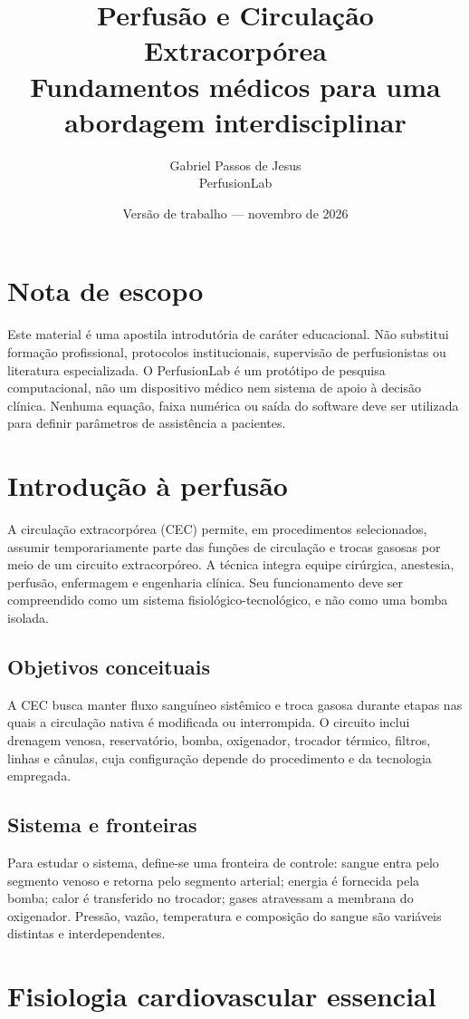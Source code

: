\documentclass[11pt,a4paper,oneside]{book}
\title{Perfusão e Circulação Extracorpórea\\\large Fundamentos médicos para uma abordagem interdisciplinar}
\author{Gabriel Passos de Jesus\\\small PerfusionLab}
\date{Versão de trabalho — novembro de 2026}
\begin{document}
\frontmatter
\maketitle
\chapter*{Nota de escopo}
Este material é uma apostila introdutória de caráter educacional. Não substitui formação profissional, protocolos institucionais, supervisão de perfusionistas ou literatura especializada. O PerfusionLab é um protótipo de pesquisa computacional, não um dispositivo médico nem sistema de apoio à decisão clínica. Nenhuma equação, faixa numérica ou saída do software deve ser utilizada para definir parâmetros de assistência a pacientes.
\tableofcontents
\mainmatter
\chapter{Introdução à perfusão}
A circulação extracorpórea (CEC) permite, em procedimentos selecionados, assumir temporariamente parte das funções de circulação e trocas gasosas por meio de um circuito extracorpóreo. A técnica integra equipe cirúrgica, anestesia, perfusão, enfermagem e engenharia clínica. Seu funcionamento deve ser compreendido como um sistema fisiológico-tecnológico, e não como uma bomba isolada.

\section{Objetivos conceituais}
A CEC busca manter fluxo sanguíneo sistêmico e troca gasosa durante etapas nas quais a circulação nativa é modificada ou interrompida. O circuito inclui drenagem venosa, reservatório, bomba, oxigenador, trocador térmico, filtros, linhas e cânulas, cuja configuração depende do procedimento e da tecnologia empregada.

\section{Sistema e fronteiras}
Para estudar o sistema, define-se uma fronteira de controle: sangue entra pelo segmento venoso e retorna pelo segmento arterial; energia é fornecida pela bomba; calor é transferido no trocador; gases atravessam a membrana do oxigenador. Pressão, vazão, temperatura e composição do sangue são variáveis distintas e interdependentes.

\chapter{Fisiologia cardiovascular essencial}
\end{document}
